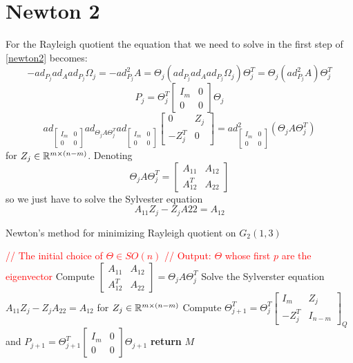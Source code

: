 \documentclass[11pt,a4paper]{report}
\begin{document}
\section{Newton 2}
For the Rayleigh quotient the equation that we need to solve in the first step of \ref{newton2} becomes:
$$ -ad_{P_j} ad_{A} ad_{P_j} \Omega_j = - ad^2_{P_j} A = \Theta_j(ad_{P_j} ad_A ad_{P_j} \Omega_j) \Theta_j^T = \Theta_j (ad_{P_j}^2 A) \Theta_j^T  $$
$$ P_j = \Theta_j^T \begin{bmatrix} I_m & 0 \\ 0 & 0 \end{bmatrix} \Theta_j $$
$$ ad_{\begin{bmatrix} I_m & 0 \\ 0 & 0  \end{bmatrix} } ad_{\Theta_j A \Theta_j^T} ad_{\begin{bmatrix} I_m & 0 \\ 0 & 0 \end{bmatrix}}
    \begin{bmatrix} 0 & Z_j \\ -Z_j^T & 0 \end{bmatrix} = ad^2_{\begin{bmatrix}  I_m & 0 \\ 0 & 0 \end{bmatrix}} (\Theta_j A \Theta_j^T)$$ 
    for $Z_j \in \mathbb{R}^{m \times (n-m)}$. Denoting
    $$\Theta_j A \Theta_j^T = \begin{bmatrix} A_{11} & A_{12} \\ A_{12}^T & A_{22} \end{bmatrix} $$
    so we just have to solve the Sylvester equation
    $$ A_{11} Z_j - Z_j A22 = A_{12} $$

\begin{algorithm}
\caption{Newton's method for minimizing Rayleigh quotient on $G_2(1,3)$ }
    \begin{algorithmic}[1]
        \State \textcolor{red}{// The initial choice of $\Theta \in SO(n)$}
        \State \textcolor{red}{// Output: $\Theta$ whose first $p$ are the eigenvector}
        \State Compute $\begin{bmatrix} A_{11} & A_{12} \\ A_{12}^T & A_{22} \end{bmatrix} = \Theta_j A \Theta_j^T$
        \State Solve the Sylverster equation $A_{11} Z_j - Z_j A_{22} = A_{12}$ for $Z_j \in \mathbb{R}^{m \times (n-m)}$
        \State 
        \State Compute $\Theta_{j+1}^T = \Theta_j^T \begin{bmatrix} I_m & Z_j \\ -Z_j^T & I_{n-m} \end{bmatrix}_Q $ 
        and 
        $ P_{j+1} = \Theta_{j+1}^T \begin{bmatrix} I_m & 0 \\ 0 & 0 \end{bmatrix} \Theta_{j+1} $
        \EndWhile
        \State \textbf{return} $M$
        \EndProcedure
    \end{algorithmic}
\end{algorithm}
\end{document}
